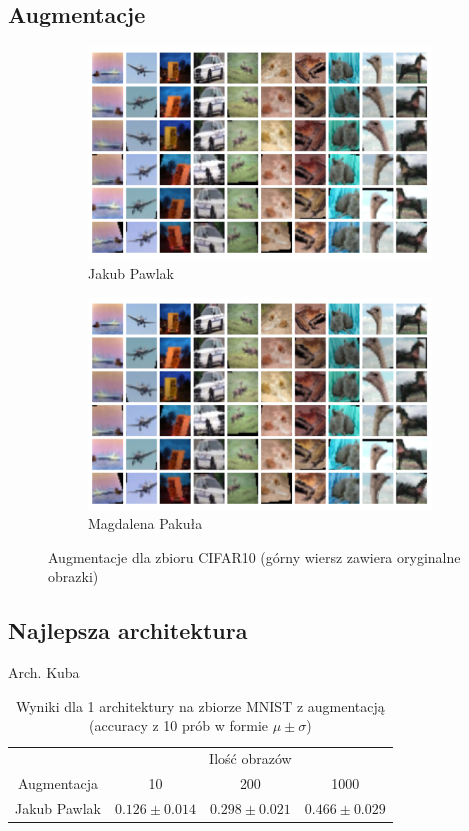\documentclass[10pt]{article}
\begin{document}
\subsection*{Augmentacje}

\begin{figure}[H]\centering
    \begin{subfigure}[t]{.45\textwidth}
        \centering
        \includegraphics[width=.7\linewidth]{img/kuba/cifar/augmentations.png}
        \caption{Jakub Pawlak}
    \end{subfigure}
    \begin{subfigure}[t]{.45\textwidth}
        \centering
        \includegraphics[width=.7\linewidth]{img/kuba/cifar/augmentations.png}
        \caption{Magdalena Pakuła}
    \end{subfigure}
    \caption{Augmentacje dla zbioru CIFAR10 (górny wiersz zawiera oryginalne obrazki)}
\end{figure}


\subsection*{Najlepsza architektura}

Arch. Kuba

\begin{table}[H]\centering
    \begin{tabular}{cccc}
        \toprule
                     & \multicolumn{3}{c}{Ilość obrazów}                                          \\ \cmidrule{2-4}
        Augmentacja  & 10                                & 200                & 1000              \\ \midrule
        Jakub Pawlak & $0.126 \pm 0.014 $                & $0.298 \pm 0.021 $ & $0.466 \pm 0.029$ \\
        \bottomrule
    \end{tabular}
    \caption{Wyniki dla 1 architektury na zbiorze MNIST z augmentacją (accuracy z 10 prób w formie $\mu \pm \sigma$)}
\end{table}
\end{document}
